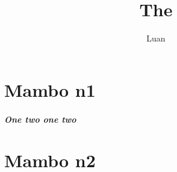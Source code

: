 \documentclass[11pt, a4paper]{article}
\title{The}
\author{Luan}
\begin{document}
\maketitle

\chapter{Mambo n1}
\paragraph{One two one two}
\chapter{Mambo n2}
\end{document}
